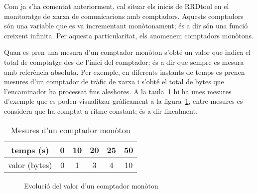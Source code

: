 Com ja s'ha comentat anteriorment, cal situar els inicis de RRDtool en el monitoratge de xarxa de comunicacions amb comptadors. Aquests comptadors són una variable que es va incrementant monòtonament; és a dir són una funció creixent infinita. Per aquesta particularitat, els anomenem comptadors monòtons.

Quan es pren una mesura d'un comptador monòton s'obté un valor que indica el total de comptatge des de l'inici del comptador; és a dir que sempre es mesura amb referència absoluta. 
Per exemple, en diferents instants de temps es prenen mesures d'un comptador de tràfic de xarxa i s'obté el total de bytes que l'encaminador ha processat fins aleshores. A la taula~\ref{tab:velocitats:counter} hi ha unes mesures d'exemple que es poden visualitzar gràficament a la figura~\ref{fig:velocitats:counter}, entre mesures es considera que ha comptat a ritme constant; és a dir linealment.

\begin{table}[tbp]
\centering
\begin{tabular}{c|ccccc}
  temps (s) & 0 & 10 & 20 & 25 & 50 \\ \hline
valor (bytes)& 0 & 1 & 3 & 4 & 10
\end{tabular}
\caption{Mesures d'un comptador monòton}
\label{tab:velocitats:counter}
\end{table}

\begin{figure}[tbp]
  \centering
  \caption{Evolució del valor d'un comptador monòton}
  \label{fig:velocitats:counter}
\end{figure}



